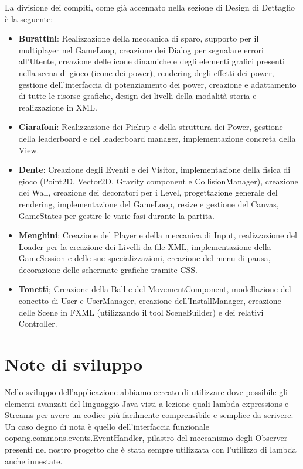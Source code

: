 \documentclass[a4paper,12pt]{report}
\begin{document}
La divisione dei compiti, come già accennato nella sezione di Design di Dettaglio è la seguente:
\begin{itemize}
	\item \textbf{Burattini}: Realizzazione della meccanica di sparo, supporto per il multiplayer nel GameLoop, creazione dei Dialog per segnalare errori all'Utente, creazione delle icone dinamiche e degli elementi grafici presenti nella scena di gioco (icone dei power), rendering degli effetti dei power, gestione dell'interfaccia di potenziamento dei power, creazione e adattamento di tutte le risorse grafiche, design dei livelli della modalità storia e realizzazione in XML.
	\item \textbf{Ciarafoni}: Realizzazione dei Pickup e della struttura dei Power, gestione della leaderboard e del leaderboard manager, implementazione concreta della View.
	\item \textbf{Dente}: Creazione degli Eventi e dei Visitor, implementazione della fisica di gioco (Point2D, Vector2D, Gravity component e CollisionManager), creazione dei Wall, creazione dei decoratori per i Level, progettazione generale del rendering, implementazione del GameLoop, resize e gestione del Canvas, GameStates per gestire le varie fasi durante la partita.
	\item \textbf{Menghini}: Creazione del Player e della meccanica di Input, realizzazione del Loader per la creazione dei Livelli da file XML, implementazione della GameSession e delle sue specializzazioni, creazione del menu di pausa, decorazione delle schermate grafiche tramite CSS.
	\item \textbf{Tonetti}; Creazione della Ball e del MovementComponent, modellazione del concetto di User e UserManager, creazione dell'InstallManager, creazione delle Scene in FXML (utilizzando il tool SceneBuilder) e dei relativi Controller.
\end{itemize}

\section{Note di sviluppo}
Nello sviluppo dell'applicazione abbiamo cercato di utilizzare dove possibile gli elementi avanzati del linguaggio Java visti a lezione quali lambda expressions e Streams per avere un codice più facilmente comprensibile e semplice da scrivere.
Un caso degno di nota è quello dell'interfaccia funzionale oopang.commons.events.EventHandler, pilastro del meccanismo degli Observer presenti nel nostro progetto che è stata sempre utilizzata con l'utilizzo di lambda anche innestate.
\end{document}
